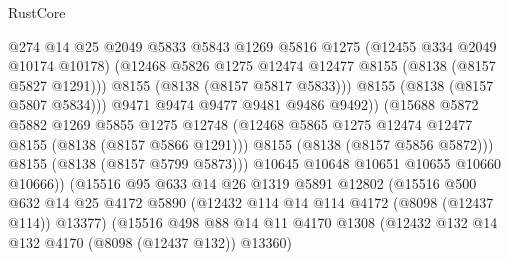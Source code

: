 \begin{lexlean}{RustCore}
\begin{coremodule}
                                  @274
                                  @14
                                  @25
                                  @2049
                                  @5833
                                  @5843
                                  @1269
                                  @5816
                                  @1275
                                  (@12455 @334 @2049 @10174 @10178)
                                  (@12468
                                    @5826
                                    @1275
                                    @12474
                                    @12477
                                    @8155
                                    (@8138 (@8157 @5827 @1291)))
                                  @8155
                                  (@8138 (@8157 @5817 @5833)))
                                @8155
                                (@8138 (@8157 @5807 @5834)))
                              @9471
                              @9474
                              @9477
                              @9481
                              @9486
                              @9492))
                          (@15688
                            @5872
                            @5882
                            @1269
                            @5855
                            @1275
                            @12748
                            (@12468 @5865 @1275 @12474 @12477 @8155 (@8138 (@8157 @5866 @1291)))
                            @8155
                            (@8138 (@8157 @5856 @5872)))
                          @8155
                          (@8138 (@8157 @5799 @5873)))
                        @10645
                        @10648
                        @10651
                        @10655
                        @10660
                        @10666))
                    (@15516
                      @95
                      @633
                      @14
                      @26
                      @1319
                      @5891
                      @12802
                      (@15516
                        @500
                        @632
                        @14
                        @25
                        @4172
                        @5890
                        (@12432 @114 @14 @114 @4172 (@8098 (@12437 @114)) @13377)
                        (@15516
                          @498
                          @88
                          @14
                          @11
                          @4170
                          @1308
                          (@12432 @132 @14 @132 @4170 (@8098 (@12437 @132)) @13360)

\end{coremodule}
\end{lexlean}
